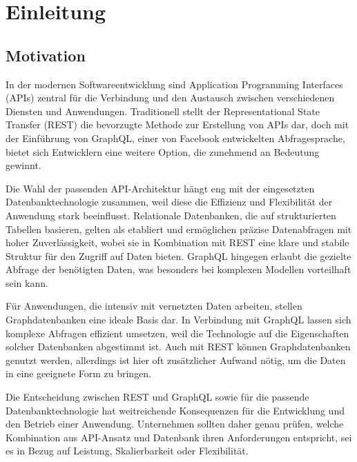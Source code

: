 \chapter{Einleitung} %
\label{sec:einleitung}
\section{Motivation} %
\label{sec:motivation}
In der modernen Softwareentwicklung sind Application Programming Interfaces (APIs) zentral für die Verbindung und den Austausch zwischen verschiedenen Diensten und Anwendungen. Traditionell stellt der Representational State Transfer (REST) die bevorzugte Methode zur Erstellung von APIs dar, doch mit der Einführung von GraphQL, einer von Facebook entwickelten Abfragesprache, bietet sich Entwicklern eine weitere Option, die zunehmend an Bedeutung gewinnt.

\noindent
Die Wahl der passenden API-Architektur hängt eng mit der eingesetzten Datenbanktechnologie zusammen, weil diese die Effizienz und Flexibilität der Anwendung stark beeinflusst. Relationale Datenbanken, die auf strukturierten Tabellen basieren, gelten als etabliert und ermöglichen präzise Datenabfragen mit hoher Zuverlässigkeit, wobei sie in Kombination mit REST eine klare und stabile Struktur für den Zugriff auf Daten bieten. GraphQL hingegen erlaubt die gezielte Abfrage der benötigten Daten, was besonders bei komplexen Modellen vorteilhaft sein kann.

\noindent
Für Anwendungen, die intensiv mit vernetzten Daten arbeiten, stellen Graphdatenbanken eine ideale Basis dar. In Verbindung mit GraphQL lassen sich komplexe Abfragen effizient umsetzen, weil die Technologie auf die Eigenschaften solcher Datenbanken abgestimmt ist. Auch mit REST können Graphdatenbanken genutzt werden, allerdings ist hier oft zusätzlicher Aufwand nötig, um die Daten in eine geeignete Form zu bringen.

\noindent
Die Entscheidung zwischen REST und GraphQL sowie für die passende Datenbanktechnologie hat weitreichende Konsequenzen für die Entwicklung und den Betrieb einer Anwendung. Unternehmen sollten daher genau prüfen, welche Kombination aus API-Ansatz und Datenbank ihren Anforderungen entspricht, sei es in Bezug auf Leistung, Skalierbarkeit oder Flexibilität.
\newpage

